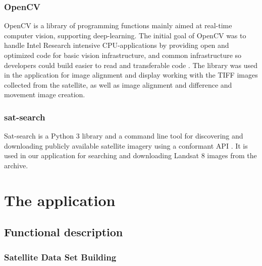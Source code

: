 \documentclass[12pt, a4paper]{report}
\begin{document}
	\subsection{OpenCV}
	OpenCV is a library of programming functions mainly aimed at real-time computer vision, supporting deep-learning. The initial goal of OpenCV was to handle Intel Research intensive CPU-applications by providing open and optimized code for basic vision infrastructure, and common infrastructure so developers could build easier to read and transferable code \cite{opencv_wiki}. The library was used in the application for image alignment and display working with the TIFF images collected from the satellite, as well as image alignment and difference and movement image creation.
	
	\subsection{sat-search}
	Sat-search is a Python 3 library and a command line tool for discovering and downloading publicly available satellite imagery using a conformant API \cite{sat-search}. It is used in our application for searching and downloading Landsat 8 images from the archive.
	
	\newpage{}
	
	
	
	
	\chapter{The application}
	
	
	\section{Functional description} 
	\subsection{Satellite Data Set Building}
\end{document}

